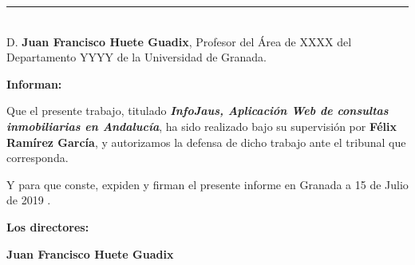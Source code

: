 \noindent\rule[-1ex]{\textwidth}{2pt}\\[4.5ex]

D. \textbf{Juan Francisco Huete Guadix}, Profesor del Área de XXXX del Departamento YYYY de la Universidad de Granada.

\vspace{0.5cm}

\textbf{Informan:}

\vspace{0.5cm}

Que el presente trabajo, titulado \textit{\textbf{InfoJaus, Aplicación Web de consultas inmobiliarias en Andalucía}},
ha sido realizado bajo su supervisión por \textbf{Félix Ramírez García}, y autorizamos la defensa de dicho trabajo ante el tribunal que corresponda.

\vspace{0.5cm}

Y para que conste, expiden y firman el presente informe en Granada a 15 de Julio de 2019 .

\vspace{1cm}

\textbf{Los directores:}

\vspace{5cm}

\noindent \textbf{Juan Francisco Huete Guadix}

\newpage %
